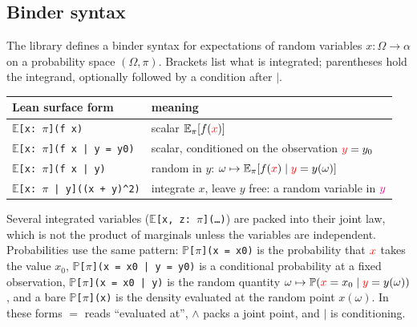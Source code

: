 \documentclass[11pt,a4paper]{article}
\newcommand{\E}{\mathbb{E}}
\newcommand{\Prb}{\mathbb{P}}
\newcommand{\rv}[1]{{\color{red}#1}}       %
\newcommand{\ra}[1]{{\color{magenta}#1}}   %
\begin{document}
\subsection{Binder syntax}
The library defines a binder syntax for expectations of random variables $x:\Omega\to\alpha$ on a probability space $(\Omega,\pi)$.
Brackets list what is integrated; parentheses hold the integrand, optionally followed by a condition after $\mid$.
\begin{center}
\begin{tabular}{@{}ll@{}}
\toprule
Lean surface form & meaning \\
\midrule
\texttt{$\mathbb{E}$[x: $\pi$](f x)} & scalar $\E_\pi[f(\rv{x})]$ \\
\texttt{$\mathbb{E}$[x: $\pi$](f x | y = y0)} & scalar, conditioned on the observation $\rv{y}=y_0$ \\
\texttt{$\mathbb{E}$[x: $\pi$](f x | y)} & random in $y$: $\omega\mapsto\E_\pi[f(\rv{x})\mid \rv{y}=y(\omega)]$ \\
\texttt{$\mathbb{E}$[x: $\pi$ | y]((x + y)\^{}2)} & integrate $x$, leave $y$ free: a random variable in $\ra{y}$\\
\bottomrule
\end{tabular}
\end{center}
Several integrated variables (\texttt{$\mathbb{E}$[x, z: $\pi$](\dots)}) are packed into their joint law, which is not the product of marginals unless the variables are independent.
Probabilities use the same pattern: \texttt{$\mathbb{P}$[$\pi$](x = x0)} is the probability that $\rv{x}$ takes the value $x_0$, \texttt{$\mathbb{P}$[$\pi$](x = x0 | y = y0)} is a conditional probability at a fixed observation, \texttt{$\mathbb{P}$[$\pi$](x = x0 | y)} is the random quantity $\omega\mapsto\Prb(\rv{x}=x_0\mid\rv{y}=y(\omega))$, and a bare \texttt{$\mathbb{P}$[$\pi$](x)} is the density evaluated at the random point $x(\omega)$.
In these forms $=$ reads ``evaluated at'', $\wedge$ packs a joint point, and $\mid$ is conditioning.
\end{document}
